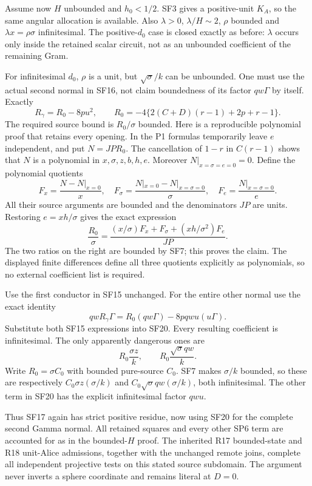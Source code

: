 Assume now $H$ unbounded and $h_0<1/2$. SF3 gives a positive-unit
$K_A$, so the same angular allocation is available. Also
$\lambda>0$, $\lambda/H\sim2$, $\rho$ bounded and
$\lambda x=\rho\sigma$ infinitesimal. The positive-$d_0$ case is
closed exactly as before: $\lambda$ occurs only inside the retained
scalar circuit, not as an unbounded coefficient of the remaining Gram.

For infinitesimal $d_0$, $\rho$ is a unit, but $\sqrt\sigma/k$
can be unbounded. One must use the actual second normal in SF16,
not claim boundedness of its factor $qw\Gamma$ by itself. Exactly
\[
 R_\gamma=R_0-8pu^2,\qquad
 R_0=-4\{2(C+D)(r-1)+2p+r-1\}.
 \tag{SF18}
\]
The required source bound is $R_0/\sigma$ bounded. Here is a
reproducible polynomial proof that retains every opening. In the
P1 formulas temporarily leave $e$ independent, and put
$N=JP R_0$. The cancellation of $1-r$ in $C(r-1)$ shows that $N$
is a polynomial in $x,\sigma,z,b,h,e$. Moreover
$N|_{x=\sigma=e=0}=0$. Define the polynomial quotients
\[
 F_x=\frac{N-N|_{x=0}}x,\quad
 F_\sigma=\frac{N|_{x=0}-N|_{x=\sigma=0}}\sigma,\quad
 F_e=\frac{N|_{x=\sigma=0}}e.
\]
All their source arguments are bounded and the denominators $JP$
are units. Restoring $e=xh/\sigma$ gives the exact expression
\[
 \frac{R_0}{\sigma}
 =\frac{(x/\sigma)F_x+F_\sigma+(xh/\sigma^2)F_e}{JP}.
 \tag{SF19}
\]
The two ratios on the right are bounded by SF7; this proves the
claim. The displayed finite differences define all three quotients
explicitly as polynomials, so no external coefficient list is required.

Use the first conductor in SF15 unchanged. For the entire other
normal use the exact identity
\[
 qwR_\gamma\Gamma=R_0(qw\Gamma)-8p qwu(u\Gamma).
 \tag{SF20}
\]
Substitute both SF15 expressions into SF20. Every resulting
coefficient is infinitesimal. The only apparently dangerous ones are
\[
 R_0\frac{\sigma z}{k},\qquad
 R_0\frac{\sqrt\sigma qw}{k}.
\]
Write $R_0=\sigma C_0$ with bounded pure-source $C_0$. SF7 makes
$\sigma/k$ bounded, so these are respectively
$C_0\sigma z(\sigma/k)$ and
$C_0\sqrt\sigma qw(\sigma/k)$, both infinitesimal. The other
term in SF20 has the explicit infinitesimal factor $qwu$.

Thus SF17 again has strict positive residue, now using SF20 for the
complete second Gamma normal. All retained squares and every other
SP6 term are accounted for as in the bounded-$H$ proof. The inherited
R17 bounded-state and R18 unit-Alice admissions, together with the
unchanged remote joins, complete all independent projective tests on
this stated source subdomain. The argument never inverts a sphere
coordinate and remains literal at $D=0$.

